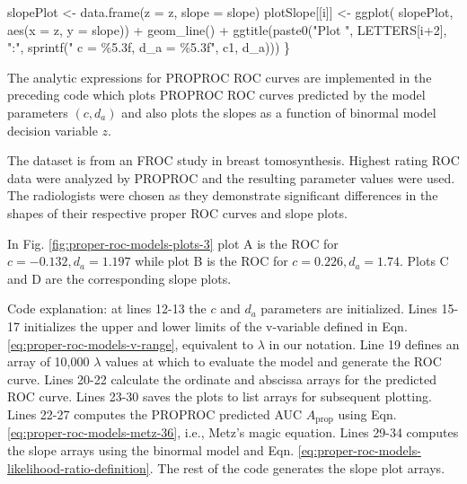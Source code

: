 \documentclass[
]{book}
\newenvironment{Shaded}{\begin{snugshade}}{\end{snugshade}}
\newcommand{\AttributeTok}[1]{\textcolor[rgb]{0.77,0.63,0.00}{#1}}
\newcommand{\DecValTok}[1]{\textcolor[rgb]{0.00,0.00,0.81}{#1}}
\newcommand{\FunctionTok}[1]{\textcolor[rgb]{0.00,0.00,0.00}{#1}}
\newcommand{\NormalTok}[1]{#1}
\newcommand{\OtherTok}[1]{\textcolor[rgb]{0.56,0.35,0.01}{#1}}
\newcommand{\SpecialCharTok}[1]{\textcolor[rgb]{0.00,0.00,0.00}{#1}}
\newcommand{\StringTok}[1]{\textcolor[rgb]{0.31,0.60,0.02}{#1}}
\begin{document}
\begin{Shaded}
\begin{Highlighting}[numbers=left,,]
\NormalTok{  slopePlot }\OtherTok{\textless{}{-}} \FunctionTok{data.frame}\NormalTok{(}\AttributeTok{z =}\NormalTok{ z, }\AttributeTok{slope =}\NormalTok{ slope)}
\NormalTok{  plotSlope[[i]] }\OtherTok{\textless{}{-}} \FunctionTok{ggplot}\NormalTok{(}
\NormalTok{    slopePlot, }\FunctionTok{aes}\NormalTok{(}\AttributeTok{x =}\NormalTok{ z, }\AttributeTok{y =}\NormalTok{ slope)) }\SpecialCharTok{+} 
    \FunctionTok{geom\_line}\NormalTok{() }\SpecialCharTok{+} 
    \FunctionTok{ggtitle}\NormalTok{(}\FunctionTok{paste0}\NormalTok{(}\StringTok{"Plot "}\NormalTok{, }
\NormalTok{                   LETTERS[i}\SpecialCharTok{+}\DecValTok{2}\NormalTok{], }
                   \StringTok{":"}\NormalTok{, }
                   \FunctionTok{sprintf}\NormalTok{(}\StringTok{" c = \%5.3f, d\_a = \%5.3f"}\NormalTok{, }
\NormalTok{                           c1, d\_a)))}
\NormalTok{\}}
\end{Highlighting}
\end{Shaded}

The analytic expressions for PROPROC ROC curves are implemented in the preceding code which plots PROPROC ROC curves predicted by the model parameters \((c,d_a)\) and also plots the slopes as a function of binormal model decision variable \(z\).

The dataset \citep{andersson2008breast} is from an FROC study in breast tomosynthesis. Highest rating ROC data were analyzed by PROPROC and the resulting parameter values were used. The radiologists were chosen as they demonstrate significant differences in the shapes of their respective proper ROC curves and slope plots.

In Fig. \ref{fig:proper-roc-models-plots-3} plot A is the ROC for \(c = -0.132, d_a = 1.197\) while plot B is the ROC for \(c = 0.226, d_a = 1.74\). Plots C and D are the corresponding slope plots.

Code explanation: at lines 12-13 the \(c\) and \(d_a\) parameters are initialized. Lines 15-17 initializes the upper and lower limits of the v-variable defined in Eqn. \eqref{eq:proper-roc-models-v-range}, equivalent to \(\lambda\) in our notation. Line 19 defines an array of 10,000 \(\lambda\) values at which to evaluate the model and generate the ROC curve. Lines 20-22 calculate the ordinate and abscissa arrays for the predicted ROC curve. Lines 23-30 saves the plots to list arrays for subsequent plotting. Lines 22-27 computes the PROPROC predicted AUC \(A_{\text{prop}}\) using Eqn. \eqref{eq:proper-roc-models-metz-36}, i.e., Metz's magic equation. Lines 29-34 computes the slope arrays using the binormal model and Eqn. \eqref{eq:proper-roc-models-likelihood-ratio-definition}. The rest of the code generates the slope plot arrays.
\end{document}
